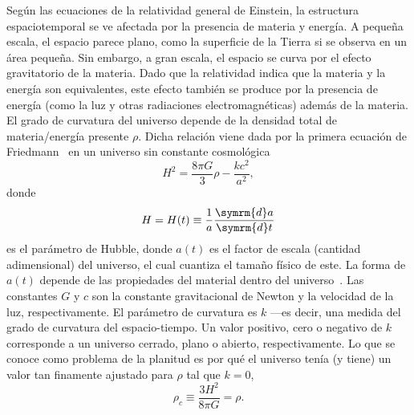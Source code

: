 Según las ecuaciones de la relatividad general de Einstein, la estructura espaciotemporal se ve afectada por la presencia de materia y energía. A pequeña escala, el espacio parece plano, como la superficie de la Tierra si se observa en un área pequeña. Sin embargo, a gran escala, el espacio se curva por el efecto gravitatorio de la materia. Dado que la relatividad indica que la materia y la energía son equivalentes, este efecto también se produce por la presencia de energía (como la luz y otras radiaciones electromagnéticas) además de la materia. El grado de curvatura del universo depende de la densidad total de materia/energía presente \(\rho\). Dicha relación viene dada por la primera ecuación de Friedmann~\cite{friedmann1922125} en un universo sin constante cosmológica
\begin{equation}
    H^2=\frac{8\pi G}{3}\rho-\frac{kc^2}{a^2},\label{eq::friedmann}
\end{equation}
donde
\begin{equation}
    H=H(t)\equiv \frac{1}{a}\frac{\symrm{d}a}{\symrm{d}t}
\end{equation}
es el parámetro de Hubble, donde \(a(t)\) es el factor de escala (cantidad adimensional) del universo, el cual cuantiza el tamaño físico de este. La forma de \(a(t)\) depende de las propiedades del material dentro del universo~\cite{liddle1998introduction}. Las constantes \(G\) y \(c\) son la constante gravitacional de Newton y la velocidad de la luz, respectivamente. El parámetro de curvatura es \(k\) ---es decir, una medida del grado de curvatura del espacio-tiempo. Un valor positivo, cero o negativo de \(k\) corresponde a un universo cerrado, plano o abierto, respectivamente. Lo que se conoce como problema de la planitud es por qué el universo tenía (y tiene) un valor tan finamente ajustado para \(\rho\) tal que \(k=0\),
\begin{equation}
    \rho_c\equiv\frac{3H^2}{8\pi G}=\rho.
\end{equation}

